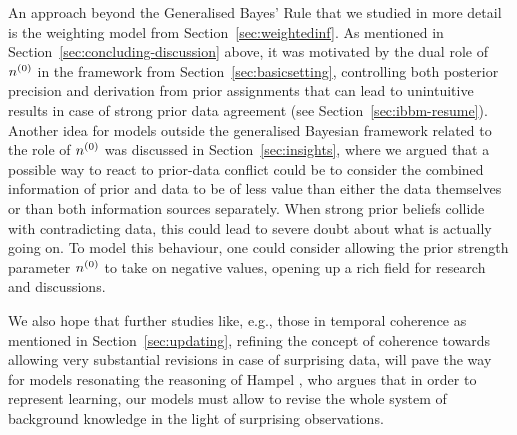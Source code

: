 An approach beyond the Generalised Bayes' Rule that we studied in more detail
is the weighting model from Section~\ref{sec:weightedinf}.
As mentioned in Section~\ref{sec:concluding-discussion} above,
it was motivated by the dual role of $n^{(0)}$ in the framework from Section~\ref{sec:basicsetting},
controlling both posterior precision and derivation from prior assignments
that can lead to unintuitive results in case of strong prior data agreement (see Section~\ref{sec:ibbm-resume}).
Another idea for models outside the generalised Bayesian framework
related to the role of $n^{(0)}$ was discussed in Section~\ref{sec:insights},
where we argued that a possible way to react to prior-data
conflict could be to consider the combined information of prior and data
to be of less value than either the data themselves
or than both information sources separately.
When strong prior beliefs collide with contradicting data,
this could lead to severe doubt about what is actually going on.
To model this behaviour, one could consider allowing the prior strength parameter $n^{(0)}$
to take on negative values, opening up a rich field for research and discussions.


We also hope that further studies like, e.g., those in temporal coherence as mentioned in Section~\ref{sec:updating},
refining the concept of coherence towards allowing very substantial revisions in case of surprising data, %
will pave the way for models resonating the %
reasoning of Hampel \parencite*{2009:hampel:knowledge,2011:hampel},
who argues that in order to represent learning,
our models must allow to revise 
the whole system of background knowledge 
in the light of surprising observations.











